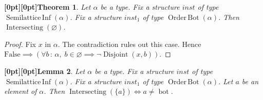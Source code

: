 \documentclass{article}
\makeatletter
\newcommand{\paperanchor}[1]{\hypertarget{#1}{}}%
\def\paperdest{\pdfextension dest}\def\paperstart{\pdfextension startlink}%
\def\paperend{\pdfextension endlink}\def\papercolor{\pdfextension colorstack}%
\let\paperdest\pdfdest\let\paperstart\pdfstartlink\let\paperend\pdfendlink\let\papercolor\pdfcolorstack
\newcommand{\paperanchor}[1]{\paperdest name{#1} xyz}%
\newcommand{\paperanchor}[1]{\special{pdf:dest (#1) [@thispage /XYZ null @ypos null]}}%
\newcommand{\paperlineanchor}[1]{\raisebox{10pt}[0pt][0pt]{\paperanchor{#1}}}
\DeclareRobustCommand{\paperresultname}[1]{\paperlineanchor{theorem:\arabic{theorem}}#1}
\theoremstyle{paperresult}
\newtheorem{theorem}{\paperresultname{Theorem}}
\newtheorem{lemma}[theorem]{\paperresultname{Lemma}}
\makeatother
\begin{document}
\begin{theorem}\label{theorem:4}
Let \(\alpha\) be a type. Fix a structure \(\mathit{inst}\) of type \(\operatorname{Semilattice\,Inf}\left(\alpha\right)\). Fix a structure \(\mathit{inst}_{1}\) of type \(\operatorname{Order\,Bot}\left(\alpha\right)\). Then \(\operatorname{Intersecting}\left(\varnothing\right)\).
\end{theorem}

\begin{proof}
Fix \(x\) in \(\alpha\).
The contradiction rules out this case. Hence \(\mathrm{False} \implies (\forall b\, :\, \alpha,\; b \in \varnothing \implies \neg \operatorname{Disjoint}(x,\allowbreak{} b))\).
\end{proof}

\begin{lemma}\label{theorem:5}
Let \(\alpha\) be a type. Fix a structure \(\mathit{inst}\) of type \(\operatorname{Semilattice\,Inf}\left(\alpha\right)\). Fix a structure \(\mathit{inst}_{1}\) of type \(\operatorname{Order\,Bot}\left(\alpha\right)\). Let \(a\) be an element of \(\alpha\). Then \(\operatorname{Intersecting}\left(\{a\}\right) \iff a \ne \operatorname{bot}\).
\end{lemma}
\end{document}
